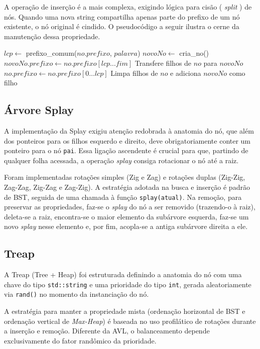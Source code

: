 \documentclass[conference]{IEEEtran}
\begin{document}
A operação de inserção é a mais complexa, exigindo lógica para cisão ( \textit{split} ) de nós. Quando uma nova string compartilha apenas parte do prefixo de um nó existente, o nó original é cindido. O pseudocódigo a seguir ilustra o cerne da manutenção dessa propriedade.

\begin{algorithmic}[1]
\STATE $lcp \leftarrow$ prefixo\_comum($no.prefixo$, $palavra$)
    \STATE $novoNo \leftarrow$ cria\_no()
    \STATE $novoNo.prefixo \leftarrow no.prefixo[lcp \dots fim]$
    \STATE Transfere filhos de $no$ para $novoNo$
    \STATE $no.prefixo \leftarrow no.prefixo[0 \dots lcp]$
    \STATE Limpa filhos de $no$ e adiciona $novoNo$ como filho
\ENDIF
\end{algorithmic}

\subsection{Árvore Splay}
A implementação da Splay exigiu atenção redobrada à anatomia do nó, que além dos ponteiros para os filhos esquerdo e direito, deve obrigatoriamente conter um ponteiro para o nó \texttt{pai}. Essa ligação ascendente é crucial para que, partindo de qualquer folha acessada, a operação \textit{splay} consiga rotacionar o nó até a raiz.

Foram implementadas rotações simples (Zig e Zag) e rotações duplas (Zig-Zig, Zag-Zag, Zig-Zag e Zag-Zig). A estratégia adotada na busca e inserção é padrão de BST, seguida de uma chamada à função \texttt{splay(atual)}. Na remoção, para preservar as propriedades, faz-se o \textit{splay} do nó a ser removido (trazendo-o à raiz), deleta-se a raiz, encontra-se o maior elemento da subárvore esquerda, faz-se um novo \textit{splay} nesse elemento e, por fim, acopla-se a antiga subárvore direita a ele.

\subsection{Treap}
A Treap (Tree + Heap) foi estruturada definindo a anatomia do nó com uma chave do tipo \texttt{std::string} e uma prioridade do tipo \texttt{int}, gerada aleatoriamente via \texttt{rand()} no momento da instanciação do nó.

A estratégia para manter a propriedade mista (ordenação horizontal de BST e ordenação vertical de \textit{Max-Heap}) é baseada no uso profilático de rotações durante a inserção e remoção. Diferente da AVL, o balanceamento depende exclusivamente do fator randômico da prioridade.
\end{document}

